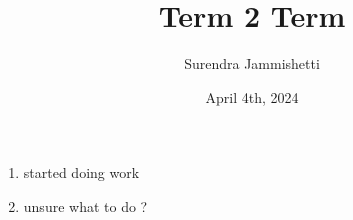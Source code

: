 \documentclass[12pt, letterpaper]{article}
\title{Term 2 Term}
\author{Surendra Jammishetti}
\date{April 4th, 2024}
\begin{document}
\maketitle
\begin{sloppypar}

    \begin{enumerate}

        \item started doing work
        \item 
                unsure what to do ?
    \end{enumerate}



\end{sloppypar}
\end{document}

